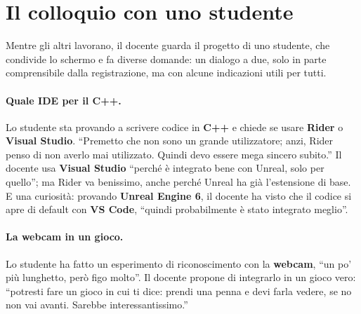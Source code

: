 \section{Il colloquio con uno studente}
\label{gd13:sec:colloquio}

Mentre gli altri lavorano, il docente guarda il progetto di uno studente, che
condivide lo schermo e fa diverse domande: un dialogo a due, solo in parte
comprensibile dalla registrazione, ma con alcune indicazioni utili per tutti.

\paragraph{Quale IDE per il C++.} Lo studente sta provando a scrivere codice in
\textbf{C++} e chiede se usare \textbf{Rider} o \textbf{Visual Studio}. ``Premetto
che non sono un grande utilizzatore; anzi, Rider penso di non averlo mai
utilizzato. Quindi devo essere mega sincero subito.'' Il docente usa
\textbf{Visual Studio} ``perché è integrato bene con Unreal, solo per quello'';
ma Rider va benissimo, anche perché Unreal ha già l'estensione di base. E una
curiosità: provando \textbf{Unreal Engine 6}, il docente ha visto che il codice
si apre di default con \textbf{VS Code}, ``quindi probabilmente è stato integrato
meglio''.

\paragraph{La webcam in un gioco.} Lo studente ha fatto un esperimento di
riconoscimento con la \textbf{webcam}, ``un po' più lunghetto, però figo
molto''. Il docente propone di integrarlo in un gioco vero: ``potresti fare un
gioco in cui ti dice: prendi una penna e devi farla vedere, se no non vai
avanti. Sarebbe interessantissimo.''

